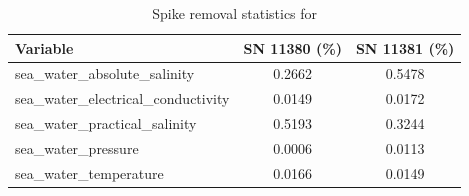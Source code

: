 \begin{table}[h]
\centering
\caption{Spike removal statistics for \projectname{} \casenumber{}}
\label{tab:spike_stats}
\begin{tabular}{|l|c|c|}
\hline
Variable & SN 11380 (\%) & SN 11381 (\%) \\
\hline
sea\_water\_absolute\_salinity & 0.2662 & 0.5478 \\
sea\_water\_electrical\_conductivity & 0.0149 & 0.0172 \\
sea\_water\_practical\_salinity & 0.5193 & 0.3244 \\
sea\_water\_pressure & 0.0006 & 0.0113 \\
sea\_water\_temperature & 0.0166 & 0.0149 \\
\hline
\end{tabular}
\end{table}
